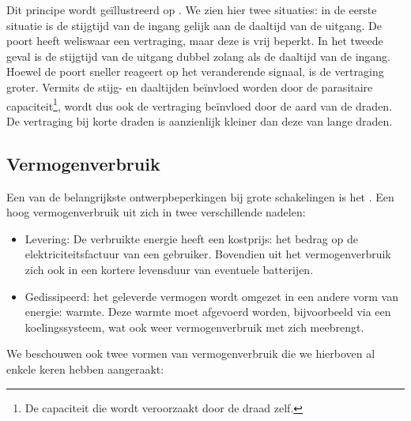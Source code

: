 Dit principe wordt ge\"illustreerd op . We zien hier twee situaties: in de eerste situatie is de stijgtijd van de ingang gelijk aan de daaltijd van de uitgang. De poort heeft weliswaar een vertraging, maar deze is vrij beperkt. In het tweede geval is de stijgtijd van de uitgang dubbel zolang als de daaltijd van de ingang. Hoewel de poort sneller reageert op het veranderende signaal, is de vertraging groter. Vermits de stijg- en daaltijden be\"invloed worden door de parasitaire capaciteit\footnote{De capaciteit die wordt veroorzaakt door de draad zelf.}, wordt dus ook de vertraging be\"invloed door de aard van de draden. De vertraging bij korte draden is aanzienlijk kleiner dan deze van lange draden.

\subsection{Vermogenverbruik}
Een van de belangrijkste ontwerpbeperkingen bij grote schakelingen is het . Een hoog vermogenverbruik uit zich in twee verschillende nadelen:

\begin{itemize}
 \item Levering: De verbruikte energie heeft een kostprijs: het bedrag op de elektriciteitsfactuur van een gebruiker. Bovendien uit het vermogenverbruik zich ook in een kortere levensduur van eventuele batterijen.
 \item Gedissipeerd: het geleverde vermogen wordt omgezet in een andere vorm van energie: warmte. Deze warmte moet afgevoerd worden, bijvoorbeeld via een koelingssysteem, wat ook weer vermogenverbruik met zich meebrengt.
\end{itemize}

We beschouwen ook twee vormen van vermogenverbruik die we hierboven al enkele keren hebben aangeraakt:

